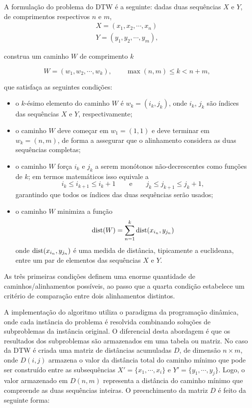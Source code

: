 A formulação do problema \citep{salvador2007toward} do DTW é a seguinte: dadas duas sequências $X$ e $Y$, de comprimentos respectivos $n$ e $m$,
\begin{align*}
    X = (x_1, x_2, \cdots, x_n) \\
    Y = (y_1, y_2, \cdots, y_m),
\end{align*}

construa um caminho $W$ de comprimento $k$

\begin{equation*}
    W = (w_1, w_2, \cdots, w_k), \qquad \max(n, m) \leq k < n + m,
\end{equation*}

\noindent que satisfaça as seguintes condições:

\begin{itemize}
\item o $k$-ésimo elemento do caminho $W$ é $w_k = (i_k, j_k)$, onde $i_k$, $j_k$ são índices das sequências $X$ e $Y$, respectivamente;
\item o caminho $W$ deve começar em $w_1 = (1, 1)$ e deve terminar em $w_k = (n, m)$, de forma a assegurar que o alinhamento considera as duas sequências completas;
\item o caminho $W$ força $i_k$ e $j_k$ a serem monótonos não-decrescentes como funções de $k$; em termos matemáticos isso equivale a
\begin{equation*}
    i_k \leq i_{k+1} \leq i_k + 1 \qquad \mbox{e} \qquad j_k\leq j_{k+1} \leq j_k + 1,
\end{equation*}
garantindo que todos os índices das duas sequências serão usados;
\item o caminho $W$ minimiza a função 
\begin{equation*}
    \mbox{dist}(W) = \sum_{n=1}^{k} \mbox{dist}(x_{i_n}, y_{j_n})
\end{equation*}
onde $\mbox{dist}(x_{i_n}, y_{j_n})$ é uma medida de distância, tipicamente a euclideana, entre um par de elementos das sequências $X$ e $Y$.
\end{itemize}

As três primeiras condições definem uma enorme quantidade de caminhos/alinhamentos possíveis, ao passo que a quarta condição estabelece um critério de comparação entre dois alinhamentos distintos.

A implementação do algoritmo utiliza o paradigma da programação dinâmica, onde cada instância do problema é resolvida combinando soluções de subproblemas da instância original. O diferencial desta abordagem é que os resultados dos subproblemas são armazenados em uma tabela ou matriz. No caso da DTW é criada uma matriz de distâncias acumuladas $D$, de dimensão $n \times m$, onde $D(i, j)$ armazena o valor da distância total do caminho mínimo que pode ser construído entre as subsequências $X' = \{x_1, \cdots, x_i\}$ e $Y' = \{y_1, \cdots, y_j\}$. Logo, o valor armazenado em $D(n, m)$ representa a distância do caminho mínimo que compreende as duas sequências inteiras. O preenchimento da matriz $D$ é feito da seguinte forma:

